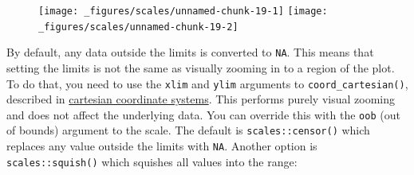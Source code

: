 \begin{Shaded}
\begin{Highlighting}[]
\StringTok{ }
\StringTok{  }\NormalTok{(}\NormalTok{(} \StringTok{ }
\StringTok{  }\NormalTok{(} \NormalTok{)}
\StringTok{ }
\StringTok{  }\NormalTok{(}\NormalTok{(} \StringTok{ }
\StringTok{  }\NormalTok{(} \NormalTok{(}\NormalTok{,}\NormalTok{)) +}\StringTok{ }
\StringTok{  }\NormalTok{(} \NormalTok{(}\NormalTok{,}\NormalTok{)) +}
\StringTok{  }\NormalTok{(} \NormalTok{)}
\end{Highlighting}
\end{Shaded}

\begin{figure}[H]
  \centering
  \texttt{[image: \_figures/scales/unnamed-chunk-19-1]}%
  \texttt{[image: \_figures/scales/unnamed-chunk-19-2]}
\end{figure}

By default, any data outside the limits is converted to \texttt{NA}.
This means that setting the limits is not the same as visually zooming
in to a region of the plot. To do that, you need to use the
\texttt{xlim} and \texttt{ylim} arguments to
\texttt{coord\_cartesian()}, described in
\protect\hyperlink{sub:cartesian}{cartesian coordinate systems}. This
performs purely visual zooming and does not affect the underlying data.
 You can override this with the \texttt{oob} (out of
bounds) argument to the scale. The default is \texttt{scales::censor()}
which replaces any value outside the limits with \texttt{NA}. Another
option is \texttt{scales::squish()} which squishes all values into the
range:

